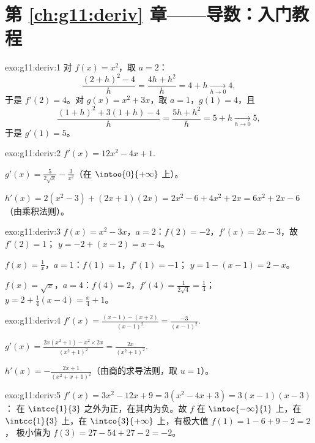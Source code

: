 \section*{第 \ref{ch:g11:deriv} 章——导数：入门教程}

\begin{solution}{exo:g11:deriv:1}
对 $f(x) = x^2$，取 $a = 2$：
\[
\frac{(2+h)^2 - 4}{h} = \frac{4h + h^2}{h} = 4 + h
\xrightarrow[h\to0]{} 4,
\]
于是 $f'(2) = 4$。对 $g(x) = x^2 + 3x$，取 $a = 1$，$g(1) = 4$，且
\[
\frac{(1+h)^2 + 3(1+h) - 4}{h} = \frac{5h + h^2}{h} = 5 + h
\xrightarrow[h\to0]{} 5,
\]
于是 $g'(1) = 5$。
\end{solution}

\begin{solution}{exo:g11:deriv:2}
$f'(x) = 12x^2 - 4x + 1$.

$g'(x) = \frac{5}{2\sqrt x} - \frac{3}{x^2}$（在 $\intoo{0}{+\infty}$ 上）。

$h'(x) = 2(x^2 - 3) + (2x+1)(2x) = 2x^2 - 6 + 4x^2 + 2x
= 6x^2 + 2x - 6$（由乘积法则）。
\end{solution}

\begin{solution}{exo:g11:deriv:3}
$f(x) = x^2 - 3x$，$a = 2$：$f(2) = -2$，$f'(x) = 2x - 3$，故 $f'(2) = 1$；
 $y = -2 + (x - 2) = x - 4$。

$f(x) = \frac1x$，$a = 1$：$f(1) = 1$，$f'(1) = -1$；
$y = 1 - (x - 1) = 2 - x$。

$f(x) = \sqrt x$，$a = 4$：$f(4) = 2$，$f'(4) = \frac{1}{2\sqrt4} =
\frac14$； $y = 2 + \frac14(x - 4) = \frac{x}{4} + 1$。
\end{solution}

\begin{solution}{exo:g11:deriv:4}
$f'(x) = \frac{(x-1) - (x+2)}{(x-1)^2} = \frac{-3}{(x-1)^2}$.

$g'(x) = \frac{2x(x^2+1) - x^2 \times 2x}{(x^2+1)^2}
= \frac{2x}{(x^2+1)^2}$.

$h'(x) = -\frac{2x+1}{(x^2+x+1)^2}$（由商的求导法则，取 $u = 1$）。
\end{solution}

\begin{solution}{exo:g11:deriv:5}
$f'(x) = 3x^2 - 12x + 9 = 3(x^2 - 4x + 3) = 3(x-1)(x-3)$：
在 $\intcc{1}{3}$ 之外为正，在其内为负。故 $f$ 在
$\intoc{-\infty}{1}$ 上，在 $\intcc{1}{3}$ 上，在
$\intco{3}{+\infty}$ 上，有极大值 $f(1) = 1 - 6 + 9 - 2 = 2$，
极小值为 $f(3) = 27 - 54 + 27 - 2 = -2$。
\end{solution}

